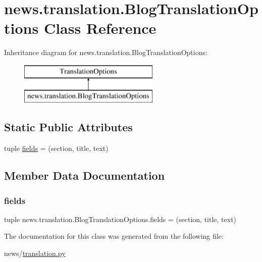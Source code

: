 \hypertarget{classnews_1_1translation_1_1_blog_translation_options}{}\section{news.\+translation.\+Blog\+Translation\+Options Class Reference}
\label{classnews_1_1translation_1_1_blog_translation_options}
Inheritance diagram for news.\+translation.\+Blog\+Translation\+Options\+:\begin{figure}[H]
\begin{center}
\leavevmode
\includegraphics[height=2.000000cm]{classnews_1_1translation_1_1_blog_translation_options}
\end{center}
\end{figure}
\subsection*{Static Public Attributes}
\begin{DoxyCompactItemize}
\item 
tuple \mbox{\hyperlink{classnews_1_1translation_1_1_blog_translation_options_abc5be6b7080eafd09766bfa7096c4c7f}{fields}} = (\textquotesingle{}section\textquotesingle{}, \textquotesingle{}title\textquotesingle{}, \textquotesingle{}text\textquotesingle{})
\end{DoxyCompactItemize}


\subsection{Member Data Documentation}
\mbox{\label{classnews_1_1translation_1_1_blog_translation_options_abc5be6b7080eafd09766bfa7096c4c7f}} 
\subsubsection{\texorpdfstring{fields}{fields}}
{\footnotesize\ttfamily tuple news.\+translation.\+Blog\+Translation\+Options.\+fields = (\textquotesingle{}section\textquotesingle{}, \textquotesingle{}title\textquotesingle{}, \textquotesingle{}text\textquotesingle{})\hspace{0.3cm}{\ttfamily [static]}}



The documentation for this class was generated from the following file\+:\begin{DoxyCompactItemize}
\item 
news/\mbox{\hyperlink{translation_8py}{translation.\+py}}\end{DoxyCompactItemize}
